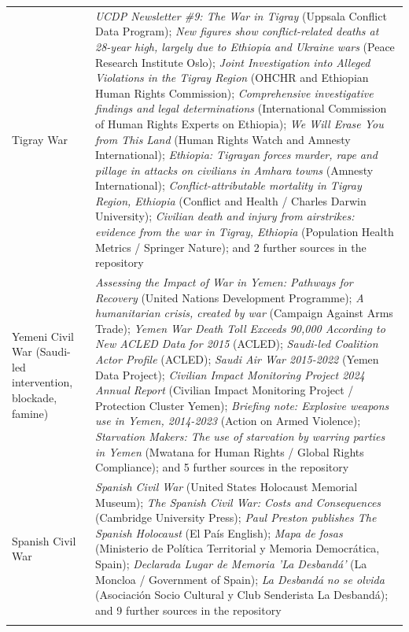 \documentclass[11pt]{article}
\begin{document}
\begin{scriptsize}
\begin{longtable}{p{3.5cm} p{12.5cm}}
Tigray War & \emph{UCDP Newsletter \#9: The War in Tigray} (Uppsala Conflict Data Program); \emph{New figures show conflict-related deaths at 28-year high, largely due to Ethiopia and Ukraine wars} (Peace Research Institute Oslo); \emph{Joint Investigation into Alleged Violations in the Tigray Region} (OHCHR and Ethiopian Human Rights Commission); \emph{Comprehensive investigative findings and legal determinations} (International Commission of Human Rights Experts on Ethiopia); \emph{We Will Erase You from This Land} (Human Rights Watch and Amnesty International); \emph{Ethiopia: Tigrayan forces murder, rape and pillage in attacks on civilians in Amhara towns} (Amnesty International); \emph{Conflict-attributable mortality in Tigray Region, Ethiopia} (Conflict and Health / Charles Darwin University); \emph{Civilian death and injury from airstrikes: evidence from the war in Tigray, Ethiopia} (Population Health Metrics / Springer Nature); and 2 further sources in the repository \\
\addlinespace
Yemeni Civil War (Saudi-led intervention, blockade, famine) & \emph{Assessing the Impact of War in Yemen: Pathways for Recovery} (United Nations Development Programme); \emph{A humanitarian crisis, created by war} (Campaign Against Arms Trade); \emph{Yemen War Death Toll Exceeds 90,000 According to New ACLED Data for 2015} (ACLED); \emph{Saudi-led Coalition Actor Profile} (ACLED); \emph{Saudi Air War 2015-2022} (Yemen Data Project); \emph{Civilian Impact Monitoring Project 2024 Annual Report} (Civilian Impact Monitoring Project / Protection Cluster Yemen); \emph{Briefing note: Explosive weapons use in Yemen, 2014-2023} (Action on Armed Violence); \emph{Starvation Makers: The use of starvation by warring parties in Yemen} (Mwatana for Human Rights / Global Rights Compliance); and 5 further sources in the repository \\
\addlinespace
Spanish Civil War & \emph{Spanish Civil War} (United States Holocaust Memorial Museum); \emph{The Spanish Civil War: Costs and Consequences} (Cambridge University Press); \emph{Paul Preston publishes The Spanish Holocaust} (El País English); \emph{Mapa de fosas} (Ministerio de Política Territorial y Memoria Democrática, Spain); \emph{Declarada Lugar de Memoria 'La Desbandá'} (La Moncloa / Government of Spain); \emph{La Desbandá no se olvida} (Asociación Socio Cultural y Club Senderista La Desbandá); and 9 further sources in the repository \\
\addlinespace

\end{longtable}
\end{scriptsize}
\end{document}
